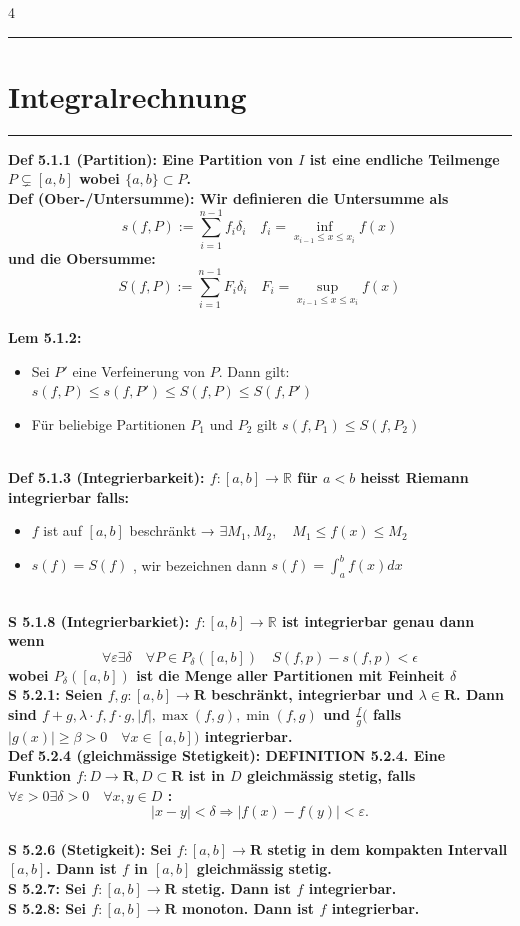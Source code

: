 \documentclass[7pt,landscape, margin = 0.1mm]{article}
\newcommand{\titellinie}{\rule{1.\linewidth}{0.75pt}}
\newcommand*{\mysection}[2][black]{\vskip 0pt \titellinie\vspace{-20pt}\section{#2}\vspace{-14pt}\titellinie \colorlet{chaptecolor}{#1}}
\newcommand{\DEF}[2]{\color{chaptercolor}\bf{Def #1}:\color{black}    \hspace{0.2cm} #2 \\}
\newcommand{\LEM}[2]{\color{chaptercolor}\bf{Lem #1}:\color{black}    \hspace{0.2cm} #2 \\}
\newcommand{\SA}[2]{\color{chaptercolor}\bf{S #1}:\color{black}    \hspace{0.2cm} #2 \\}
\begin{document}
\begin{multicols}{4}
\begin{flushleft}
{\begin{enumerate}
\end{enumerate}}




\mysection[magenta]{\centering Integralrechnung}
\DEF{5.1.1 (Partition)}{Eine Partition von $I$ ist eine endliche Teilmenge $P \subsetneq [a,b]$ wobei $\{a,b\} \subset P$.}
\DEF{ (Ober-/Untersumme)}{Wir definieren die Untersumme als
$$ s(f,P) := \sum_{i=1}^{n-1}f_i\delta_i \quad f_i = \inf_{x_{i-1}\leq x \leq x_i} f(x) $$
und die Obersumme:
$$ S(f,P) := \sum_{i=1}^{n-1}F_i\delta_i \quad F_i = \sup_{x_{i-1}\leq x \leq x_i} f(x) $$}
\LEM{5.1.2}{\begin{itemize}
\item[1.] Sei $P'$ eine Verfeinerung von $P$. Dann gilt: $s(f,P) \leq s(f,P') \leq S(f,P) \leq S(f,P')$ 
\item[2.] Für beliebige Partitionen $P_1$ und $P_2$ gilt $s(f,P_1) \leq S(f,P_2)$
\end{itemize}}
\DEF{5.1.3 (Integrierbarkeit)}{$f:[a,b] \longrightarrow \mathbb{R}$ für $a<b$ heisst Riemann integrierbar falls:
\begin{itemize}
\item[1.] $f$ ist auf $[a,b]$ beschränkt → $\exists M_1, M_2, \quad M_1 \leq f(x) \leq M_2$
\item[2.] $s(f) = S(f)$ , wir bezeichnen dann $s(f) = \int_a^b f(x)dx$\end{itemize} }
\SA{5.1.8 (Integrierbarkiet)}{$ f:[a,b] \longrightarrow \mathbb{R}$ ist integrierbar genau dann wenn $$\forall \varepsilon \exists \delta \quad \forall P \in P_{\delta} \left( [a,b]\right) \quad S(f,p) - s(f,p) < \epsilon  $$
wobei $P_{\delta} \left([a,b] \right)$ ist die Menge aller Partitionen mit Feinheit $\delta$}
\SA{5.2.1}{Seien $f, g:[a, b] \longrightarrow \mathbf{R}$ beschränkt, integrierbar und $\lambda \in \mathbf{R}$. Dann sind $f+g, \lambda \cdot f, f \cdot g,|f|, \max (f, g), \min (f, g)$ und $\frac{f}{g}($ falls $|g(x)| \geqslant \beta>0 \quad \forall x \in[a, b])$ integrierbar.}
\DEF{5.2.4 (gleichmässige Stetigkeit)}{DEFINITION 5.2.4. Eine Funktion $f: D \longrightarrow \mathbf{R}, D \subset \mathbf{R}$ ist in $D$ gleichmässig stetig, falls $\forall \varepsilon>0 \exists \delta>0 \quad \forall x, y \in D$ :
$$
|x-y|<\delta \Longrightarrow|f(x)-f(y)|<\varepsilon .
$$}
\SA{5.2.6 (Stetigkeit)}{Sei $f: [a,b] \longrightarrow \mathbf{R}$ stetig in dem kompakten Intervall $[a,b]$. Dann ist $f$ in $[a,b]$ gleichmässig stetig.}
\SA{5.2.7}{Sei $f:[a,b] \longrightarrow \mathbf{R}$ stetig. Dann ist $f$ integrierbar.}
\SA{5.2.8}{Sei $f:[a,b] \longrightarrow \mathbf{R}$ monoton. Dann ist $f$ integrierbar.}

\end{flushleft}
\end{multicols}
\end{document}
